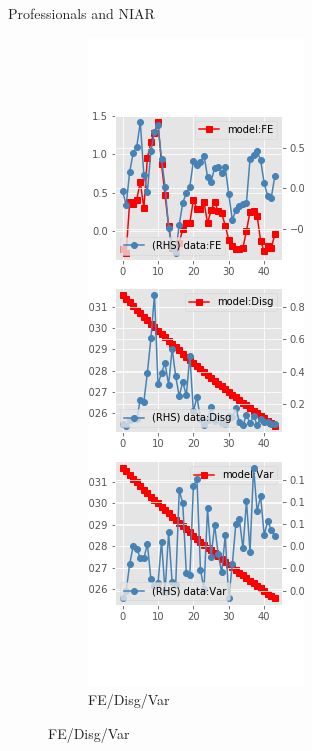 \documentclass{beamer}
\begin{document}
\begin{frame}{Professionals and NIAR}
\begin{figure}[ht]
\begin{subfigure}[b]{0.2\textwidth}
		\end{subfigure}
		\hfill
		\begin{subfigure}[b]{0.2\textwidth}
			\caption{FE/Disg/Var}
			\includegraphics[width=\textwidth, height = 0.8\textheight]{figuresDraft/spf_ni_est_diag3.png}
		\end{subfigure}
	\end{figure}
	\end{frame}
\end{document}
